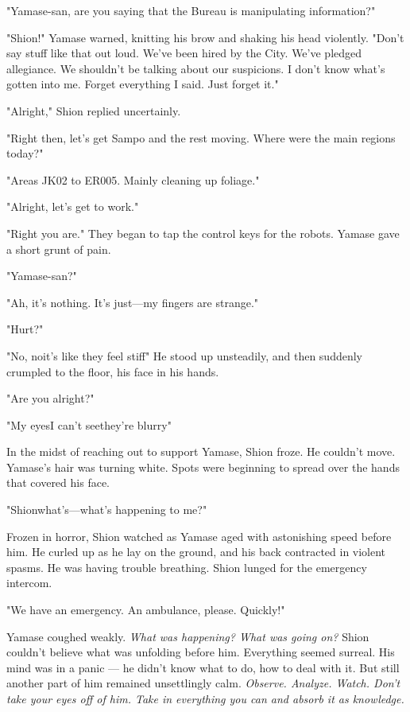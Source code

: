 "Yamase-san, are you saying that the Bureau is manipulating
information?"

"Shion!" Yamase warned, knitting his brow and shaking his head
violently. "Don't say stuff like that out loud. We've been hired by the
City. We've pledged allegiance. We shouldn't be talking about our
suspicions. I don't know what's gotten into me. Forget everything I
said. Just forget it."

"Alright," Shion replied uncertainly.

"Right then, let's get Sampo and the rest moving. Where were the main
regions today?"

"Areas JK02 to ER005. Mainly cleaning up foliage."

"Alright, let's get to work."

"Right you are." They began to tap the control keys for the robots.
Yamase gave a short grunt of pain.

"Yamase-san?"

"Ah, it's nothing. It's just---my fingers are strange."

"Hurt?"

"No, no\el it's like they feel stiff\el " He stood up unsteadily, and
then suddenly crumpled to the floor, his face in his hands.

"Are you alright?"

"My eyes\el I can't see\el they're blurry\el "

In the midst of reaching out to support Yamase, Shion froze. He couldn't
move. Yamase's hair was turning white. Spots were beginning to spread
over the hands that covered his face.

"Shion\el what's---what's happening to me\el ?"

Frozen in horror, Shion watched as Yamase aged with astonishing speed
before him. He curled up as he lay on the ground, and his back
contracted in violent spasms. He was having trouble breathing. Shion
lunged for the emergency intercom.

"We have an emergency. An ambulance, please. Quickly!"

Yamase coughed weakly. \emph{What was happening? What was going on?} Shion
couldn't believe what was unfolding before him. Everything seemed
surreal. His mind was in a panic --- he didn't know what to do, how to
deal with it. But still another part of him remained unsettlingly calm.
\emph{Observe. Analyze. Watch. Don't take your eyes off of him. Take in
everything you can and absorb it as knowledge.}

